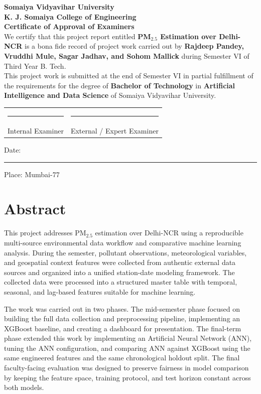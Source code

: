\documentclass[12pt,a4paper]{report}
\begin{document}
\begin{titlepage}
    \centering
    {\Large \textbf{Somaiya Vidyavihar University}}\\[0.2cm]
    {\Large \textbf{K. J. Somaiya College of Engineering}}\\[1.2cm]
    {\Large \textbf{Certificate of Approval of Examiners}}\\[1cm]

    We certify that this project report entitled \textbf{PM$_{2.5}$ Estimation over Delhi-NCR} is a bona fide record of project work carried out by \textbf{Rajdeep Pandey, Vruddhi Mule, Sagar Jadhav, and Sohom Mallick} during Semester VI of Third Year B. Tech.\\[0.8cm]

    This project work is submitted at the end of Semester VI in partial fulfillment of the requirements for the degree of \textbf{Bachelor of Technology} in \textbf{Artificial Intelligence and Data Science} of Somaiya Vidyavihar University.\\[2cm]

    \begin{tabular}{p{6cm}p{6cm}}
        \centering\rule{5cm}{0.4pt} & \centering\rule{5cm}{0.4pt} \\
        \centering Internal Examiner & \centering External / Expert Examiner \\
    \end{tabular}

    \vfill
    Date: \rule{4cm}{0.4pt} \hfill Place: Mumbai-77
\end{titlepage}


\chapter*{Abstract}

This project addresses PM$_{2.5}$ estimation over Delhi-NCR using a reproducible multi-source environmental data workflow and comparative machine learning analysis. During the semester, pollutant observations, meteorological variables, and geospatial context features were collected from authentic external data sources and organized into a unified station-date modeling framework. The collected data were processed into a structured master table with temporal, seasonal, and lag-based features suitable for machine learning.

The work was carried out in two phases. The mid-semester phase focused on building the full data collection and preprocessing pipeline, implementing an XGBoost baseline, and creating a dashboard for presentation. The final-term phase extended this work by implementing an Artificial Neural Network (ANN), tuning the ANN configuration, and comparing ANN against XGBoost using the same engineered features and the same chronological holdout split. The final faculty-facing evaluation was designed to preserve fairness in model comparison by keeping the feature space, training protocol, and test horizon constant across both models.
\end{document}
